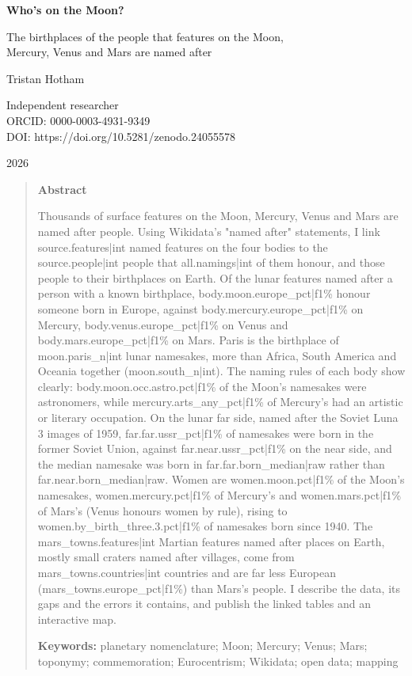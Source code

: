 \documentclass[11pt,a4paper]{article}
\begin{document}
\begin{center}
{\Large\bfseries Who's on the Moon?\par}
\vspace{0.4em}
{\large The birthplaces of the people that features on the Moon,\\Mercury, Venus and Mars are named after\par}
\vspace{1.2em}
{\large Tristan Hotham\par}
\vspace{0.3em}
{\small Independent researcher\\
ORCID: 0000-0003-4931-9349\\
DOI: https://doi.org/10.5281/zenodo.24055578\par}
\vspace{0.8em}
2026
\end{center}

\begin{quote}
\small
\begin{center}\textbf{Abstract}\end{center}
Thousands of surface features on the Moon, Mercury, Venus and Mars are named after people. Using Wikidata's "named after" statements, I link {{source.features|int}} named features on the four bodies to the {{source.people|int}} people that {{all.namings|int}} of them honour, and those people to their birthplaces on Earth. Of the lunar features named after a person with a known birthplace, {{body.moon.europe_pct|f1}}\% honour someone born in Europe, against {{body.mercury.europe_pct|f1}}\% on Mercury, {{body.venus.europe_pct|f1}}\% on Venus and {{body.mars.europe_pct|f1}}\% on Mars. Paris is the birthplace of {{moon.paris_n|int}} lunar namesakes, more than Africa, South America and Oceania together ({{moon.south_n|int}}). The naming rules of each body show clearly: {{body.moon.occ.astro.pct|f1}}\% of the Moon's namesakes were astronomers, while {{mercury.arts_any_pct|f1}}\% of Mercury's had an artistic or literary occupation. On the lunar far side, named after the Soviet Luna 3 images of 1959, {{far.far.ussr_pct|f1}}\% of namesakes were born in the former Soviet Union, against {{far.near.ussr_pct|f1}}\% on the near side, and the median namesake was born in {{far.far.born_median|raw}} rather than {{far.near.born_median|raw}}. Women are {{women.moon.pct|f1}}\% of the Moon's namesakes, {{women.mercury.pct|f1}}\% of Mercury's and {{women.mars.pct|f1}}\% of Mars's (Venus honours women by rule), rising to {{women.by_birth_three.3.pct|f1}}\% of namesakes born since 1940. The {{mars_towns.features|int}} Martian features named after places on Earth, mostly small craters named after villages, come from {{mars_towns.countries|int}} countries and are far less European ({{mars_towns.europe_pct|f1}}\%) than Mars's people. I describe the data, its gaps and the errors it contains, and publish the linked tables and an interactive map.

\textbf{Keywords:} planetary nomenclature; Moon; Mercury; Venus; Mars; toponymy; commemoration; Eurocentrism; Wikidata; open data; mapping
\end{quote}
\end{document}
